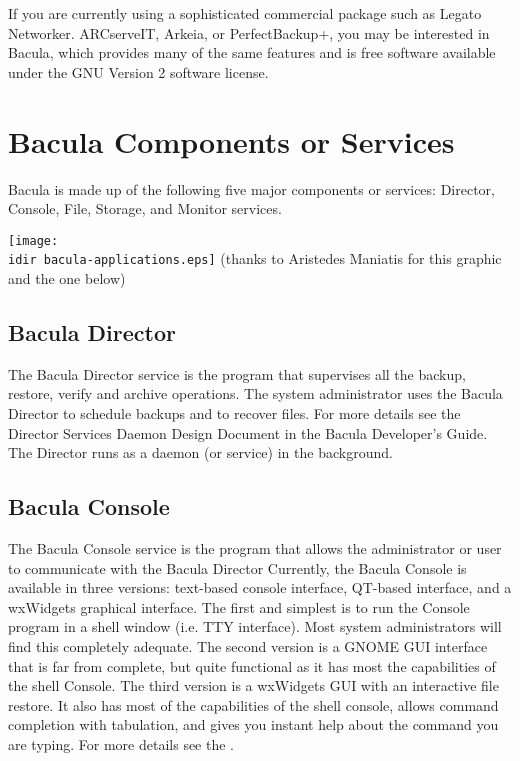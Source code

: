 If you are currently using a sophisticated commercial package such as Legato
Networker. ARCserveIT, Arkeia, or PerfectBackup+, you may be interested in
Bacula, which provides many of the same features and is free software
available under the GNU Version 2 software license. 

\section{Bacula Components or Services}

Bacula is made up of the following five major components or services:
Director, Console, File, Storage, and Monitor services.


\texttt{[image: \\idir bacula-applications.eps]} 
(thanks to Aristedes Maniatis for this graphic and the one below) 

\subsection*{Bacula Director}
   \label{DirDef}
   The Bacula Director service is the program that supervises
   all the backup, restore, verify and archive operations.  The system
   administrator uses the Bacula Director to schedule backups and to
   recover files.  For more details see the Director Services Daemon Design
   Document in the Bacula Developer's Guide.  The Director runs as a daemon
   (or service) in the background.
   \label{UADef}

\subsection*{Bacula Console}

   The Bacula Console service is the program that allows the
   administrator or user to communicate with the Bacula Director
   Currently, the Bacula Console is available in three versions:
   text-based console interface, QT-based interface, and a
   wxWidgets graphical interface.
   The first and simplest is to run the Console program in a shell window
   (i.e.  TTY interface).  Most system administrators will find this
   completely adequate.  The second version is a GNOME GUI interface that
   is far from complete, but quite functional as it has most the
   capabilities of the shell Console.  The third version is a wxWidgets GUI
   with an interactive file restore.  It also has most of the capabilities
   of the shell console, allows command completion with tabulation, and
   gives you instant help about the command you are typing.  For more
   details see the .

